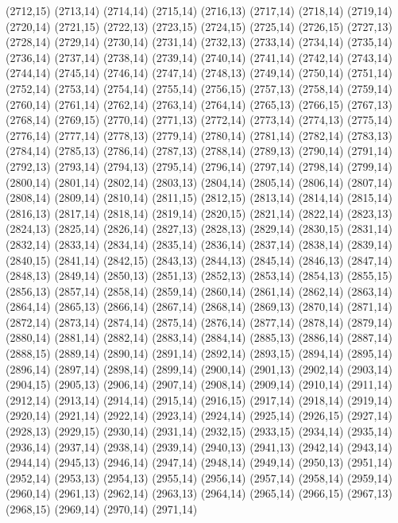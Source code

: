 (2712,15)
(2713,14)
(2714,14)
(2715,14)
(2716,13)
(2717,14)
(2718,14)
(2719,14)
(2720,14)
(2721,15)
(2722,13)
(2723,15)
(2724,15)
(2725,14)
(2726,15)
(2727,13)
(2728,14)
(2729,14)
(2730,14)
(2731,14)
(2732,13)
(2733,14)
(2734,14)
(2735,14)
(2736,14)
(2737,14)
(2738,14)
(2739,14)
(2740,14)
(2741,14)
(2742,14)
(2743,14)
(2744,14)
(2745,14)
(2746,14)
(2747,14)
(2748,13)
(2749,14)
(2750,14)
(2751,14)
(2752,14)
(2753,14)
(2754,14)
(2755,14)
(2756,15)
(2757,13)
(2758,14)
(2759,14)
(2760,14)
(2761,14)
(2762,14)
(2763,14)
(2764,14)
(2765,13)
(2766,15)
(2767,13)
(2768,14)
(2769,15)
(2770,14)
(2771,13)
(2772,14)
(2773,14)
(2774,13)
(2775,14)
(2776,14)
(2777,14)
(2778,13)
(2779,14)
(2780,14)
(2781,14)
(2782,14)
(2783,13)
(2784,14)
(2785,13)
(2786,14)
(2787,13)
(2788,14)
(2789,13)
(2790,14)
(2791,14)
(2792,13)
(2793,14)
(2794,13)
(2795,14)
(2796,14)
(2797,14)
(2798,14)
(2799,14)
(2800,14)
(2801,14)
(2802,14)
(2803,13)
(2804,14)
(2805,14)
(2806,14)
(2807,14)
(2808,14)
(2809,14)
(2810,14)
(2811,15)
(2812,15)
(2813,14)
(2814,14)
(2815,14)
(2816,13)
(2817,14)
(2818,14)
(2819,14)
(2820,15)
(2821,14)
(2822,14)
(2823,13)
(2824,13)
(2825,14)
(2826,14)
(2827,13)
(2828,13)
(2829,14)
(2830,15)
(2831,14)
(2832,14)
(2833,14)
(2834,14)
(2835,14)
(2836,14)
(2837,14)
(2838,14)
(2839,14)
(2840,15)
(2841,14)
(2842,15)
(2843,13)
(2844,13)
(2845,14)
(2846,13)
(2847,14)
(2848,13)
(2849,14)
(2850,13)
(2851,13)
(2852,13)
(2853,14)
(2854,13)
(2855,15)
(2856,13)
(2857,14)
(2858,14)
(2859,14)
(2860,14)
(2861,14)
(2862,14)
(2863,14)
(2864,14)
(2865,13)
(2866,14)
(2867,14)
(2868,14)
(2869,13)
(2870,14)
(2871,14)
(2872,14)
(2873,14)
(2874,14)
(2875,14)
(2876,14)
(2877,14)
(2878,14)
(2879,14)
(2880,14)
(2881,14)
(2882,14)
(2883,14)
(2884,14)
(2885,13)
(2886,14)
(2887,14)
(2888,15)
(2889,14)
(2890,14)
(2891,14)
(2892,14)
(2893,15)
(2894,14)
(2895,14)
(2896,14)
(2897,14)
(2898,14)
(2899,14)
(2900,14)
(2901,13)
(2902,14)
(2903,14)
(2904,15)
(2905,13)
(2906,14)
(2907,14)
(2908,14)
(2909,14)
(2910,14)
(2911,14)
(2912,14)
(2913,14)
(2914,14)
(2915,14)
(2916,15)
(2917,14)
(2918,14)
(2919,14)
(2920,14)
(2921,14)
(2922,14)
(2923,14)
(2924,14)
(2925,14)
(2926,15)
(2927,14)
(2928,13)
(2929,15)
(2930,14)
(2931,14)
(2932,15)
(2933,15)
(2934,14)
(2935,14)
(2936,14)
(2937,14)
(2938,14)
(2939,14)
(2940,13)
(2941,13)
(2942,14)
(2943,14)
(2944,14)
(2945,13)
(2946,14)
(2947,14)
(2948,14)
(2949,14)
(2950,13)
(2951,14)
(2952,14)
(2953,13)
(2954,13)
(2955,14)
(2956,14)
(2957,14)
(2958,14)
(2959,14)
(2960,14)
(2961,13)
(2962,14)
(2963,13)
(2964,14)
(2965,14)
(2966,15)
(2967,13)
(2968,15)
(2969,14)
(2970,14)
(2971,14)
